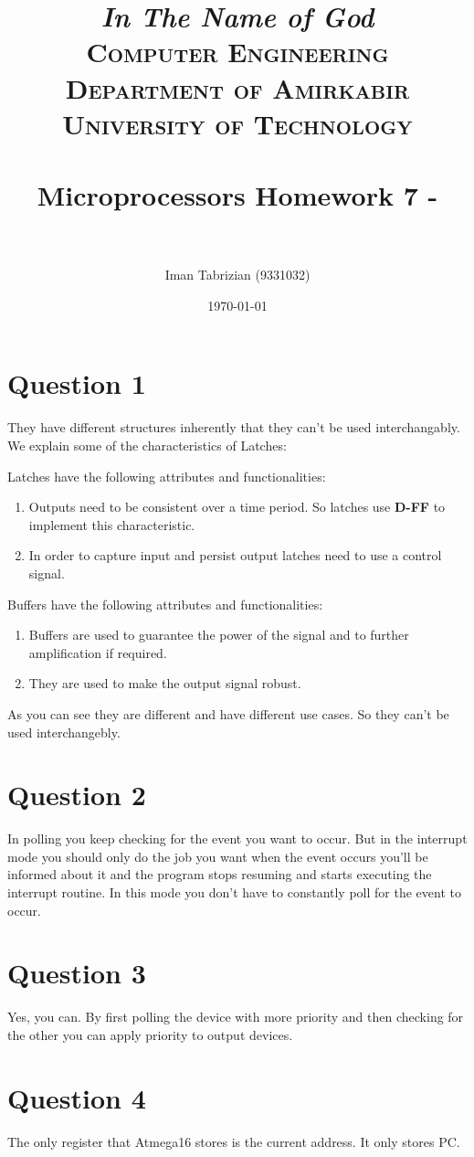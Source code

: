 \documentclass[paper=a4, fontsize=11pt]{scrartcl} %
\title{
\normalfont \normalsize
\textit{In The Name of God} \\ \textsc{Computer Engineering Department of Amirkabir University of Technology} \\ [25pt] \horrule{0.5pt} \\[0.4cm] %
\huge Microprocessors Homework 7 -  \\ %
\horrule{2pt} \\[0.5cm] %
}
\author{Iman Tabrizian (9331032)}
\date{\normalsize\today}
\numberwithin{equation}{section} %
\numberwithin{figure}{section} %
\numberwithin{table}{section} %
\begin{document}
\section{Question 1}
They have different structures inherently that they can't be used interchangably.
We explain some of the characteristics of Latches:

Latches have the following attributes and functionalities:

\begin{enumerate}
    \item
        Outputs need to be consistent over a time period. So latches use \textbf{D-FF}
        to implement this characteristic.
    \item
        In order to capture input and persist output latches need to use a control signal.
\end{enumerate}


Buffers have the following attributes and functionalities:


\begin{enumerate}
    \item
        Buffers are used to guarantee the power of the signal and to further
        amplification if required.

    \item
        They are used to make the output signal robust.

\end{enumerate}

As you can see they are different and have different use cases. So they
can't be used interchangebly.

\section{Question 2}
In polling you keep checking for the event you want to occur. But in the
interrupt mode you should only do the job you want when the event occurs you'll
be informed about it and the program stops resuming and starts executing the
interrupt routine. In this mode you don't have to constantly poll for the event
to occur.



\section{Question 3}
Yes, you can. By first polling the device with more priority and then checking
for the other you can apply priority to output devices.

\section{Question 4}
The only register that Atmega16 stores is the current address. It only stores PC.
\end{document}
